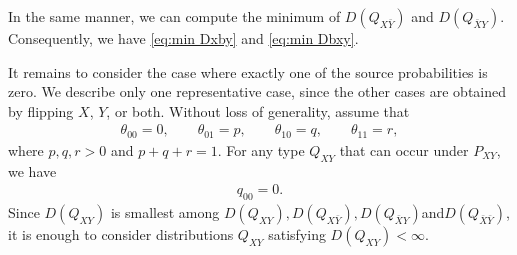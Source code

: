 \documentclass[journal,onecolumn]{IEEEtran}
\theoremstyle{definition}
\theoremstyle{remark}
\newcommand{\Dxy}{D({Q_{XY}})}
\newcommand{\Dxby}{D({Q_{X\bar{Y}}})}
\newcommand{\Dbxy}{D({Q_{\bar{X}Y}})}
\newcommand{\Dbxby}{D({Q_{\bar{X}\bar{Y}}})}
\newcommand{\Qxy}{Q_{XY}}
\newcommand{\Pxy}{P_{XY}}
\begin{document}
    In the same manner, we can compute the minimum of $\Dxby$ and $\Dbxy$.
    Consequently, we have \eqref{eq:min Dxby} and \eqref{eq:min Dbxy}.

    It remains to consider the case where exactly one of the source probabilities is zero. 
    We describe only one representative case, since the other cases are obtained by flipping $X$, $Y$, or both.
    Without loss of generality, assume that
    \begin{align*}
        \theta_{00}=0,
        \qquad
        \theta_{01}=p,
        \qquad
        \theta_{10}=q,
        \qquad
        \theta_{11}=r,
    \end{align*}
    where $p,q,r>0$ and $p+q+r=1$.
    For any type $\Qxy$ that can occur under $\Pxy$, we have
    \begin{align*}
        q_{00}=0.
    \end{align*}
    Since $\Dxy$ is smallest among $\Dxy,\Dxby,\Dbxy$and$\Dbxby$,
    it is enough to consider distributions $\Qxy$ satisfying $\Dxy<\infty$.
\end{document}
